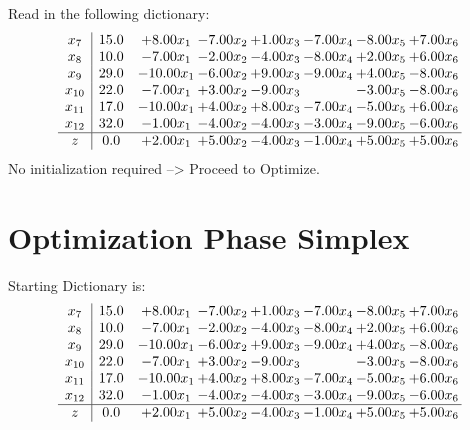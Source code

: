 \documentclass[9pt]{article}
\begin{document}
Read in the following dictionary:
\[\begin{array}{c| c c@{\hskip 2pt} c@{\hskip 2pt} c@{\hskip 2pt} c@{\hskip 2pt} c@{\hskip 2pt} c@{\hskip 2pt} }
 x_{7}   &  15.0 & +  8.00 x_{1} & -7.00 x_{2} & +  1.00 x_{3} & -7.00 x_{4} & -8.00 x_{5} & +  7.00 x_{6}\\
 x_{8}   &  10.0 & -7.00 x_{1} & -2.00 x_{2} & -4.00 x_{3} & -8.00 x_{4} & +  2.00 x_{5} & +  6.00 x_{6}\\
 x_{9}   &  29.0 & -10.00 x_{1} & -6.00 x_{2} & +  9.00 x_{3} & -9.00 x_{4} & +  4.00 x_{5} & -8.00 x_{6}\\
 x_{10}   &  22.0 & -7.00 x_{1} & +  3.00 x_{2} & -9.00 x_{3} &   & -3.00 x_{5} & -8.00 x_{6}\\
 x_{11}   &  17.0 & -10.00 x_{1} & +  4.00 x_{2} & +  8.00 x_{3} & -7.00 x_{4} & -5.00 x_{5} & +  6.00 x_{6}\\
 x_{12}   &  32.0 & -1.00 x_{1} & -4.00 x_{2} & -4.00 x_{3} & -3.00 x_{4} & -9.00 x_{5} & -6.00 x_{6}\\
\hline
z    &  0.0 & +  2.00 x_{1} & +  5.00 x_{2} & -4.00 x_{3} & -1.00 x_{4} & +  5.00 x_{5} & +  5.00 x_{6}\\
\end{array}\]
No initialization required --> Proceed to Optimize. 
\section{Optimization Phase Simplex}
Starting Dictionary is:
\[\begin{array}{c| c c@{\hskip 2pt} c@{\hskip 2pt} c@{\hskip 2pt} c@{\hskip 2pt} c@{\hskip 2pt} c@{\hskip 2pt} }
 x_{7}   &  15.0 & +  8.00 x_{1} & -7.00 x_{2} & +  1.00 x_{3} & -7.00 x_{4} & -8.00 x_{5} & +  7.00 x_{6}\\
 x_{8}   &  10.0 & -7.00 x_{1} & -2.00 x_{2} & -4.00 x_{3} & -8.00 x_{4} & +  2.00 x_{5} & +  6.00 x_{6}\\
 x_{9}   &  29.0 & -10.00 x_{1} & -6.00 x_{2} & +  9.00 x_{3} & -9.00 x_{4} & +  4.00 x_{5} & -8.00 x_{6}\\
 x_{10}   &  22.0 & -7.00 x_{1} & +  3.00 x_{2} & -9.00 x_{3} &   & -3.00 x_{5} & -8.00 x_{6}\\
 x_{11}   &  17.0 & -10.00 x_{1} & +  4.00 x_{2} & +  8.00 x_{3} & -7.00 x_{4} & -5.00 x_{5} & +  6.00 x_{6}\\
 x_{12}   &  32.0 & -1.00 x_{1} & -4.00 x_{2} & -4.00 x_{3} & -3.00 x_{4} & -9.00 x_{5} & -6.00 x_{6}\\
\hline
z    &  0.0 & +  2.00 x_{1} & +  5.00 x_{2} & -4.00 x_{3} & -1.00 x_{4} & +  5.00 x_{5} & +  5.00 x_{6}\\
\end{array}\]
\end{document}
